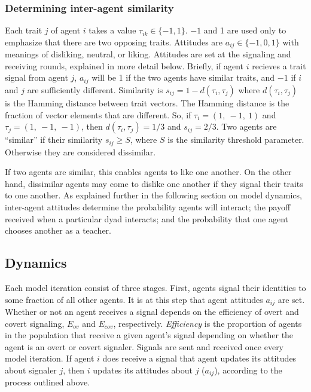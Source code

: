 \documentclass[11pt,letterpaper]{article}
\begin{document}
\subsubsection{Determining inter-agent similarity}

Each trait $j$ of agent $i$ takes a value $\tau_{ik} \in \{-1, 1\}$. $-1$ and 1
are used only to emphasize that there are two opposing traits.
Attitudes are $a_{ij} \in \{-1, 0, 1\}$ with meanings of 
disliking, neutral, or liking. Attitudes are set at the signaling and receiving
rounds, explained in more detail below. Briefly, if agent $i$ recieves a
trait signal from agent $j$, $a_{ij}$ will be 1 if the two agents have
similar traits, and $-1$ if $i$ and $j$ are sufficiently different. Similarity
is $s_{ij} = 1 - d(\tau_i, \tau_j)$ where $d(\tau_i, \tau_j)$ is the
Hamming distance between trait vectors. The Hamming distance is the fraction
of vector elements that are different. So, if $\tau_i = (1,~-1,~1)$ and
$\tau_j = (1,~-1,~-1)$, then $d(\tau_i, \tau_j) = 1/3$ and $s_{ij}=2/3$.
Two agents are ``similar'' if their similarity $s_{ij} \geq S$, where
$S$ is the similarity threshold parameter. Otherwise they are considered
dissimilar. 

If two agents are similar, this enables agents to like one another. On the
other hand, dissimilar agents may come to dislike one another if they signal
their traits to one another. As explained further in the following section on
model dynamics, inter-agent attitudes determine the probability agents will
interact; the payoff received when a particular dyad interacts; and the
probability that one agent chooses another as a teacher.

\subsection{Dynamics}

Each model iteration consist of three stages. First, agents signal their identities
to some fraction of all other agents. It is at this step that agent attitudes
$a_{ij}$ are set. Whether or not an agent receives a signal depends on the
efficiency of overt and covert signaling, $E_{ov}$ and $E_{cov}$, respectively.
\emph{Efficiency} is the proportion of agents in the population that receive
a given agent's signal depending on whether the agent is an overt or covert
signaler.  Signals are sent and received once every model iteration. 
If agent $i$ does receive a signal that agent updates its attitudes about
signaler $j$, then $i$ updates its attitudes about $j$ ($a_{ij}$), according to
the process outlined above.
\end{document}
